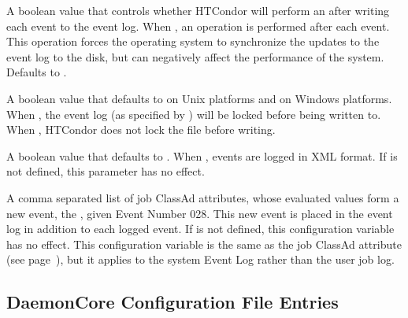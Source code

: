 \begin{description}
\label{param:EventLogFsync}
\item[\Macro{EVENT\_LOG\_FSYNC}]
  A boolean value that controls whether HTCondor will perform an
   after writing each event to the event log.
  When ,
  an  operation is performed after each event.
  This  operation forces the operating system to
  synchronize the updates to the event log to the disk, but can
  negatively affect the performance of the system.  
  Defaults to .

\label{param:EventLogLocking}
\item[\Macro{EVENT\_LOG\_LOCKING}]
  A boolean value that defaults to  on Unix platforms and
   on Windows platforms.
  When ,
  the event log (as specified by )
  will be locked before being written to.
  When , HTCondor does not lock the file before writing.

\label{param:EventLogUseXML}
\item[\Macro{EVENT\_LOG\_USE\_XML}]
  A boolean value that defaults to .
  When , events are logged in XML format.
  If  is not defined, this parameter has no effect.

\label{param:EventLogJobAdInformationAttrs}
\item[\Macro{EVENT\_LOG\_JOB\_AD\_INFORMATION\_ATTRS}]
  A comma separated list of job ClassAd attributes,
  whose evaluated values form a new event, the ,
  given Event Number 028.
  This new event is placed in the event log in addition to each logged event.
  If  is not defined, this configuration variable
  has no effect.
  This configuration variable is the same as the job ClassAd attribute
   (see
  page~\pageref{JobAdInformationAttrs-job-attribute}),
  but it applies to the system Event Log rather than the user job log.

\end{description}

\subsection{\label{sec:DaemonCore-Config-File-Entries}DaemonCore Configuration File Entries} 

